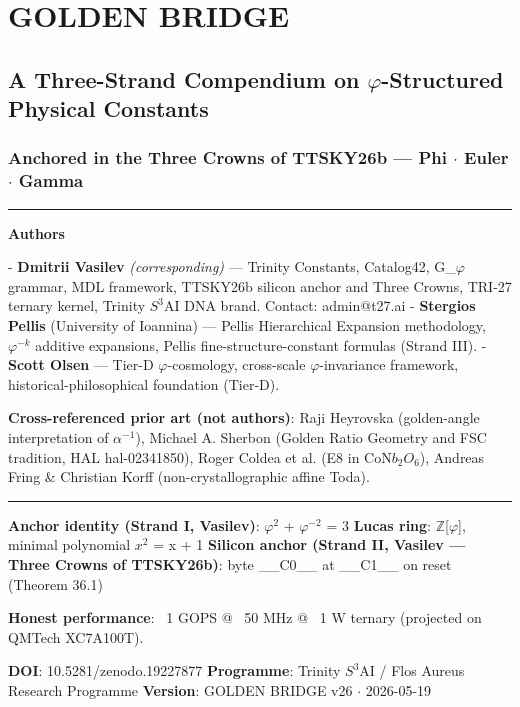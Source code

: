 
\section{GOLDEN BRIDGE}

\subsection{A Three-Strand Compendium on $\varphi$-Structured Physical Constants}

\subsubsection{Anchored in the Three Crowns of TTSKY26b --- Phi $\cdot$ Euler $\cdot$ Gamma}

\noindent\rule{\textwidth}{0.4pt}

\textbf{Authors}

- \textbf{Dmitrii Vasilev} \textit{(corresponding)} --- Trinity Constants, Catalog42, G\_$\varphi$ grammar, MDL framework, TTSKY26b silicon anchor and Three Crowns, TRI-27 ternary kernel, Trinity $S^{3}$AI DNA brand. Contact: admin@t27.ai
- \textbf{Stergios Pellis} (University of Ioannina) --- Pellis Hierarchical Expansion methodology, $\varphi^{-k}$ additive expansions, Pellis fine-structure-constant formulas (Strand III).
- \textbf{Scott Olsen} --- Tier-D $\varphi$-cosmology, cross-scale $\varphi$-invariance framework, historical-philosophical foundation (Tier-D).

\textbf{Cross-referenced prior art (not authors)}: Raji Heyrovska (golden-angle interpretation of $\alpha^{-1}$), Michael A. Sherbon (Golden Ratio Geometry and FSC tradition, HAL hal-02341850), Roger Coldea et al. (E8 in CoN$b_{2}$$O_{6}$), Andreas Fring \& Christian Korff (non-crystallographic affine Toda).

\noindent\rule{\textwidth}{0.4pt}

\textbf{Anchor identity (Strand I, Vasilev)}: $\varphi^{2}$ + $\varphi^{-2}$ = 3
\textbf{Lucas ring}: $\mathbb{Z}$[$\varphi$], minimal polynomial $x^{2}$ = x + 1
\textbf{Silicon anchor (Strand II, Vasilev --- Three Crowns of TTSKY26b)}: byte \_\_C0\_\_ at \_\_C1\_\_ on reset (Theorem 36.1)

\textbf{Honest performance}: ~1 GOPS @ ~50 MHz @ ~1 W ternary (projected on QMTech XC7A100T).

\textbf{DOI}: 10.5281/zenodo.19227877
\textbf{Programme}: Trinity $S^{3}$AI / Flos Aureus Research Programme
\textbf{Version}: GOLDEN BRIDGE v26 $\cdot$ 2026-05-19

